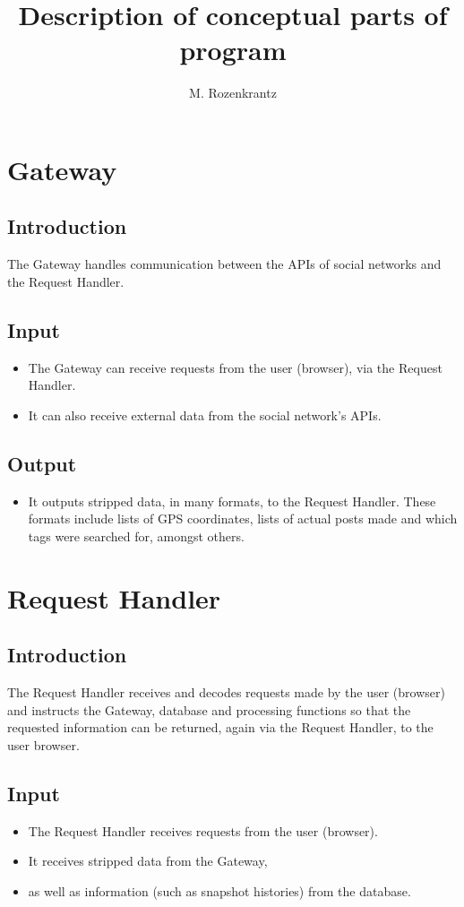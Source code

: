 \documentclass{article}
\title{Description of conceptual parts of program}
\author{M. Rozenkrantz}
\date{}
\begin{document}
\maketitle

\section{Gateway}
\subsection{Introduction}
The Gateway handles communication between the APIs of social networks and the Request Handler.
\subsection{Input}
\begin{itemize}
\item{The Gateway can receive requests from the user (browser), via the Request Handler.}
\item{It can also receive external data from the social network's APIs.}
\end{itemize}
\subsection{Output}
\begin{itemize}
\item{It outputs stripped data, in many formats, to the Request Handler. These formats include lists of GPS coordinates, lists of actual posts made and which tags were searched for, amongst others.}
\end{itemize}

\section{Request Handler}
\subsection{Introduction}
The Request Handler receives and decodes requests made by the user (browser) and instructs the Gateway, database and processing functions so that the requested information can be returned, again via the Request Handler, to the user {browser}.
\subsection{Input}
\begin{itemize}
\item{The Request Handler receives requests from the user (browser).}
\item{It receives stripped data from the Gateway,}
\item{as well as information (such as snapshot histories) from the database.}
\end{itemize}
\end{document}
